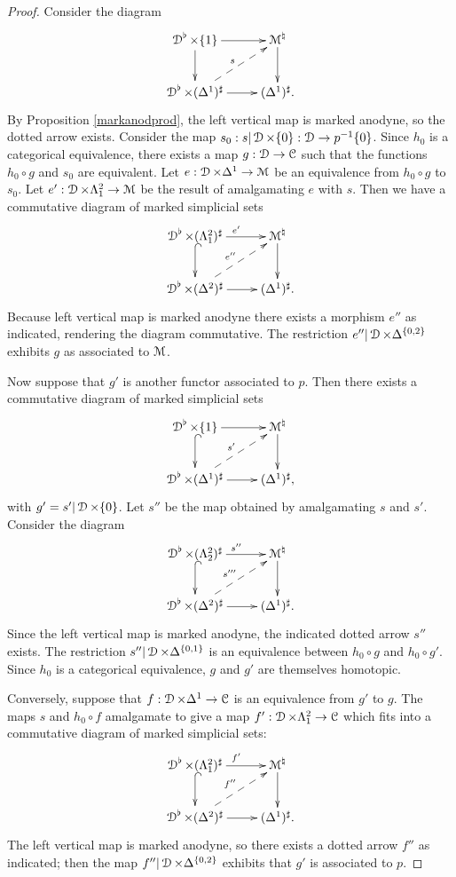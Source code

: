 \begin{proof}
Consider the diagram
$$ \xymatrix{ \calD^{\flat} \times \{1\} \ar[d] \ar[r] & \calM^{\natural} \ar[d] \\
\calD^{\flat} \times (\Delta^1)^{\sharp} \ar[r] \ar@{-->}^{s}[ur] & (\Delta^1)^{\sharp}.}$$
By Proposition \ref{markanodprod}, the left vertical map is marked anodyne, so the
dotted arrow exists. Consider the map $s_0: s| \operatorname{\mathcal{D}} \times \{0\}: \operatorname{\mathcal{D}} \rightarrow p^{-1} \{0\}$. 
Since $h_0$ is a categorical equivalence, there exists a map $g: \operatorname{\mathcal{D}} \rightarrow \operatorname{\mathcal{C}}$
such that the functions $h_0 \circ g$ and $s_0$ are equivalent. Let $e: \operatorname{\mathcal{D}} \times \Delta^1 \rightarrow \operatorname{\mathcal{M}}$ be an equivalence from $h_0 \circ g$ to $s_0$. Let $e': \operatorname{\mathcal{D}} \times \Lambda^2_1 \rightarrow \operatorname{\mathcal{M}}$ be the result of amalgamating $e$ with $s$. Then we have a commutative diagram of marked simplicial sets
$$ \xymatrix{ \calD^{\flat} \times (\Lambda^2_1)^{\sharp} \ar@{^{(}->}[d] \ar[r]^{e'} & \calM^{\natural} \ar[d] \\
\calD^{\flat} \times (\Delta^2)^{\sharp} \ar[r] \ar@{-->}[ur]^{e''} & (\Delta^1)^{\sharp}. }$$
Because left vertical map is marked anodyne there exists a morphism $e''$ as indicated, rendering the diagram commutative. The restriction
$e''| \operatorname{\mathcal{D}} \times \Delta^{ \{0,2\} }$ exhibits $g$ as associated to $\operatorname{\mathcal{M}}$.

Now suppose that $g'$ is another functor associated to $p$. Then there exists a commutative diagram of marked simplicial sets
$$ \xymatrix{ \calD^{\flat} \times \{1\} \ar@{^{(}->}[d] \ar[r] & \calM^{\natural} \ar[d] \\
\calD^{\flat} \times (\Delta^1)^{\sharp} \ar[r] \ar@{-->}[ur]^{s'} & (\Delta^1)^{\sharp},}$$
with $g' = s'| \operatorname{\mathcal{D}} \times \{0\}$. Let $s''$ be the map obtained by amalgamating
$s$ and $s'$. Consider the diagram
$$ \xymatrix{ \calD^{\flat} \times (\Lambda^2_2)^{\sharp} \ar@{^{(}->}[d] \ar[r]^{s''} & \calM^{\natural} \ar[d] \\
\calD^{\flat} \times (\Delta^2)^{\sharp} \ar[r] \ar@{-->}[ur]^{s'''} & (\Delta^1)^{\sharp}. }$$
Since the left vertical map is marked anodyne, the indicated dotted arrow $s''$ exists.
The restriction $s''| \operatorname{\mathcal{D}} \times \Delta^{ \{0,1\} }$ is an equivalence between $h_0 \circ g$ and $h_0 \circ g'$. Since $h_0$ is a categorical equivalence, $g$ and $g'$ are themselves homotopic.

Conversely, suppose that $f: \operatorname{\mathcal{D}} \times \Delta^1 \rightarrow \operatorname{\mathcal{C}}$ is an equivalence from $g'$ to $g$. The maps $s$ and $h_0 \circ f$ amalgamate to give a map $f': \operatorname{\mathcal{D}} \times \Lambda^2_1 \rightarrow \operatorname{\mathcal{C}}$ which fits into a commutative diagram of marked simplicial sets:
$$ \xymatrix{ \calD^{\flat} \times (\Lambda^2_1)^{\sharp} \ar@{^{(}->}[d] \ar[r]^{f'} & \calM^{\natural} \ar[d] \\
\calD^{\flat} \times (\Delta^2)^{\sharp} \ar[r] \ar@{-->}[ur]^{f''} & (\Delta^1)^{\sharp}. }$$
The left vertical map is marked anodyne, so there exists a dotted arrow $f''$ as indicated; then
the map $f'' | \operatorname{\mathcal{D}} \times \Delta^{ \{0,2\} }$ exhibits that $g'$ is associated to $p$.
\end{proof}

